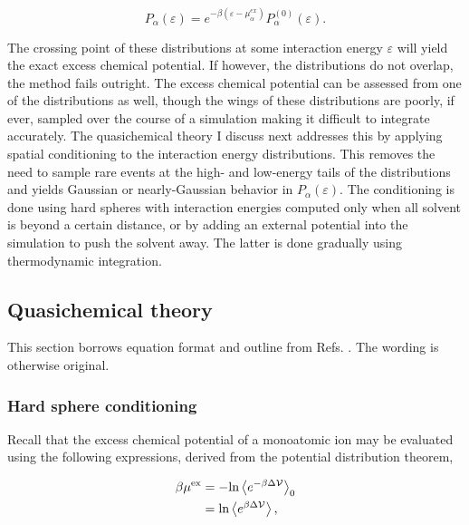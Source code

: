\begin{theory}
 \begin{equation}\label{cross}
     P_{\alpha}(\varepsilon) = e^{-\beta\left(\varepsilon-\mu^{ex}_{\alpha}\right)}P_{\alpha}^{(0)}(\varepsilon).
 \end{equation}
 
 \noindent The crossing point of these distributions at some interaction energy $\varepsilon$ will yield the exact excess 
 chemical potential. If however, the distributions do not overlap, the method fails outright. The excess chemical potential
 can be assessed from one of the distributions as well, though the wings of these distributions are poorly, if ever, sampled
 over the course of a simulation making it difficult to integrate accurately. The quasichemical theory I discuss next addresses
 this by applying spatial conditioning to the interaction energy distributions. This removes the need to sample rare events 
 at the high- and low-energy tails of the distributions and yields Gaussian or nearly-Gaussian behavior in 
 $P_{\alpha}(\varepsilon)$. The conditioning is done using hard spheres with interaction energies computed only when all solvent
 is beyond a certain distance, or by adding an external potential into the simulation to push the solvent away. The latter is
 done gradually using thermodynamic integration.

 \subsection{\label{ch2:sec4:level4}Quasichemical theory}
 This section borrows equation format and outline from Refs. \cite{shi2013length,tlbbook}. The wording is otherwise
 original.
 
  \subsubsection{\label{ch2:sec4:level4:zone1}Hard sphere conditioning}
  Recall that the excess chemical potential of a monoatomic ion may be evaluated using the following expressions, derived 
  from the potential distribution theorem,

  \begin{equation}
   \begin{split}
    \beta\mu^{\mathrm{ex}} &= -\mathrm{ln}\left<e^{-\beta\Delta\mathcal{V}}\right>_{\mathrm{0}} \\
                     &=  \mathrm{ln}\left<e^{\beta\Delta\mathcal{V}}\right>,
    \label{eqn:pdt}
   \end{split}
  \end{equation}


\end{theory}
